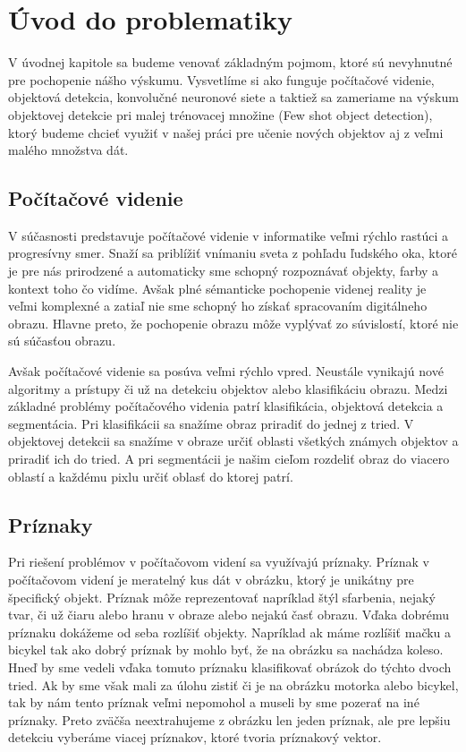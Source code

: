 \chapter{Úvod do problematiky}\label{chap:issues_overview}

V úvodnej kapitole sa budeme venovať základným pojmom, ktoré sú nevyhnutné pre pochopenie nášho výskumu. Vysvetlíme si ako funguje počítačové videnie, objektová detekcia, konvolučné neuronové siete a taktiež sa zameriame na výskum objektovej detekcie pri malej trénovacej množine (Few shot object detection), ktorý budeme chcieť využiť v našej práci pre učenie nových objektov aj z veľmi malého množstva dát.

\section{Počítačové videnie}


\setlength{\parindent}{20pt}

\hspace{\parindent}V súčasnosti predstavuje počítačové videnie v informatike veľmi rýchlo rastúci a progresívny smer. Snaží sa priblížiť vnímaniu sveta z pohľadu ľudského oka, ktoré je pre nás prirodzené a automaticky sme schopný rozpoznávať objekty, farby a kontext toho čo vidíme. Avšak plné sémanticke pochopenie videnej reality je veľmi komplexné a zatiaľ nie sme schopný ho získať spracovaním digitálneho obrazu. Hlavne preto, že pochopenie obrazu môže vyplývať zo súvislostí, ktoré nie sú súčasťou obrazu.

Avšak počítačové videnie sa posúva veľmi rýchlo vpred. Neustále vynikajú nové algoritmy a prístupy či už na detekciu objektov alebo klasifikáciu obrazu. Medzi základné problémy počítačového videnia patrí klasifikácia, objektová detekcia a segmentácia. Pri klasifikácii sa snažíme obraz priradiť do jednej z tried. V objektovej detekcii sa snažíme v obraze určiť oblasti všetkých známych objektov a priradiť ich do tried. A pri segmentácii je našim cieľom rozdeliť obraz do viacero oblastí a každému pixlu určiť oblasť do ktorej patrí. 

\section{Príznaky}

\hspace{\parindent}Pri riešení problémov v počítačovom videní sa využívajú príznaky. Príznak v počítačovom videní je meratelný kus dát v obrázku, ktorý je unikátny pre špecifický objekt. Príznak môže reprezentovať napríklad štýl sfarbenia, nejaký tvar, či už čiaru alebo hranu v obraze alebo nejakú časť obrazu. Vďaka dobrému príznaku dokážeme od seba rozlíšiť objekty. Napríklad ak máme rozlíšiť mačku a bicykel tak ako dobrý príznak by mohlo byť, že na obrázku sa nachádza koleso. Hneď by sme vedeli vďaka tomuto príznaku klasifikovať obrázok do týchto dvoch tried. Ak by sme však mali za úlohu zistiť či je na obrázku motorka alebo bicykel, tak by nám tento príznak veľmi nepomohol a museli by sme pozerať na iné príznaky. Preto zväčša neextrahujeme z obrázku len jeden príznak, ale pre lepšiu detekciu vyberáme viacej príznakov, ktoré tvoria príznakový vektor. 

